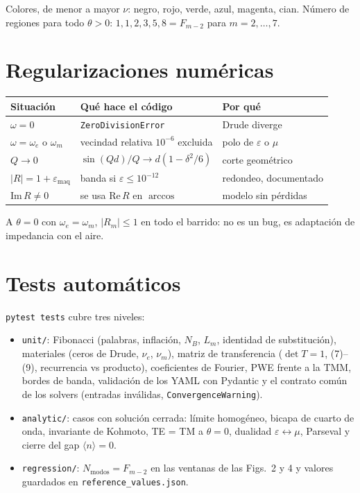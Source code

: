 \documentclass[11pt,a4paper]{article}
\begin{document}
Colores, de menor a mayor \(\nu\): negro, rojo, verde, azul, magenta, cian.
Número de regiones para todo \(\theta>0\): \(1,1,2,3,5,8=F_{m-2}\) para
\(m=2,\ldots,7\).

\section{Regularizaciones numéricas}

{\small
\begin{center}
\begin{tabular}{llp{5.8cm}}
\toprule
Situación & Qué hace el código & Por qué \\
\midrule
\(\omega=0\) & \texttt{ZeroDivisionError} & Drude diverge \\
\(\omega=\omega_e\) o \(\omega_m\) & vecindad relativa \(10^{-6}\) excluida & polo de \(\varepsilon\) o \(\mu\) \\
\(Q\to 0\) & \(\sin(Qd)/Q\to d(1-\delta^2/6)\) & corte geométrico \\
\(\lvert R\rvert=1+\varepsilon_{\mathrm{maq}}\) & banda si \(\varepsilon\le 10^{-12}\) & redondeo, documentado \\
\(\mathrm{Im}\,R\neq 0\) & se usa \(\mathrm{Re}\,R\) en \(\arccos\) & modelo sin pérdidas \\
\bottomrule
\end{tabular}
\end{center}
}

A \(\theta=0\) con \(\omega_e=\omega_m\), \(\lvert R_m\rvert\le 1\) en todo el
barrido: no es un bug, es adaptación de impedancia con el aire.

\section{Tests automáticos}

\texttt{pytest tests} cubre tres niveles:

\begin{itemize}
\item \texttt{unit/}: Fibonacci (palabras, inflación, \(N_B\), \(L_m\),
identidad de substitución), materiales (ceros de Drude, \(\nu_e\), \(\nu_m\)),
matriz de transferencia (\(\det T=1\), (7)--(9), recurrencia vs producto),
coeficientes de Fourier, PWE frente a la TMM, bordes de banda, validación de
los YAML con Pydantic y el contrato común de los solvers (entradas inválidas,
\texttt{ConvergenceWarning}).
\item \texttt{analytic/}: casos con solución cerrada: límite homogéneo, bicapa
de cuarto de onda, invariante de Kohmoto, TE = TM a \(\theta=0\), dualidad
\(\varepsilon\leftrightarrow\mu\), Parseval y cierre del gap
\(\langle n\rangle=0\).
\item \texttt{regression/}: \(N_{\mathrm{modos}}=F_{m-2}\) en las ventanas de
las Figs.~2 y 4 y valores guardados en \texttt{reference\_values.json}.
\end{itemize}
\end{document}
